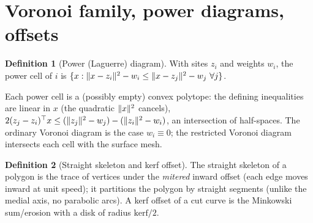 \documentclass[11pt]{article}
\theoremstyle{definition}\newtheorem{definition}{Definition}[section]
\theoremstyle{plain}\newtheorem{theorem}{Theorem}[section]
\begin{document}
\section{Voronoi family, power diagrams, offsets}
\begin{definition}[Power (Laguerre) diagram]
With sites $z_i$ and weights $w_i$, the power cell of $i$ is $\{x:\Norm{x-z_i}^2-w_i\le\Norm{x-z_j}^2-w_j\ \forall j\}$.
\end{definition}
\begin{proposition}\label{prop:power}
Each power cell is a (possibly empty) convex polytope: the defining inequalities are linear in $x$
(the quadratic $\lVert x\rVert^2$ cancels), $2(z_j-z_i)^\top x\le(\lVert z_j\rVert^2-w_j)-(\lVert z_i\rVert^2-w_i)$, an
intersection of half-spaces. The ordinary Voronoi diagram is the case $w_i\equiv0$; the restricted Voronoi
diagram intersects each cell with the surface mesh.
\end{proposition}
\begin{definition}[Straight skeleton and kerf offset]
The straight skeleton of a polygon is the trace of vertices under the \emph{mitered} inward offset (each edge
moves inward at unit speed); it partitions the polygon by straight segments (unlike the medial axis, no
parabolic arcs). A kerf offset of a cut curve is the Minkowski sum/erosion with a disk of radius
$\mathrm{kerf}/2$.
\end{definition}
\end{document}

